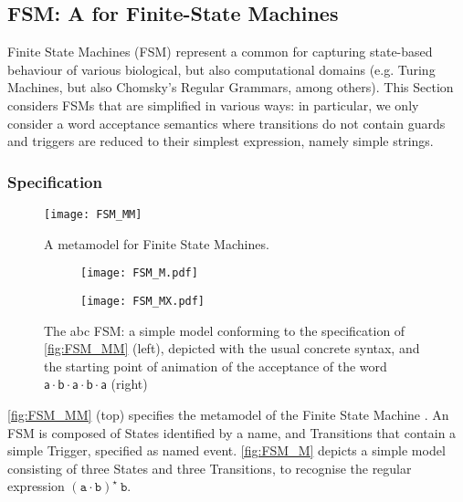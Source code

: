 \subsection{\textsf{FSM}: A \DSL for Finite-State Machines}
\label{sec:Examples:FSM}

Finite State Machines (FSM) represent a common \DSL for capturing state-based 
behaviour of various biological, but also computational domains (e.g. Turing 
Machines, but also Chomsky's Regular Grammars, among others). This Section considers
FSMs that are simplified in various ways: in particular, we only consider a
word acceptance semantics where transitions do not contain guards and triggers are
reduced to their simplest expression, namely simple strings.

\subsubsection{Specification}
\label{sec:Examples:FSM:Specification}

\begin{figure}[t]%
   \centering
   \texttt{[image: FSM\_MM]}%
   \caption{A metamodel for Finite State Machines.}%
   \label{fig:FSM_MM}%
\end{figure}

\begin{figure}[t]%
   \centering
   \begin{subfigure}[b]{0.45\columnwidth}
      \centering
      \texttt{[image: FSM\_M.pdf]}%
   \end{subfigure}
   \hfill
   \begin{subfigure}[b]{0.45\columnwidth}
      \centering
      \texttt{[image: FSM\_MX.pdf]}%
   \end{subfigure}
  \caption{The \textsf{abc} FSM: a simple model conforming to the specification
   of \autoref{fig:FSM_MM} (left), depicted with the usual concrete syntax, and 
   the starting point of animation of the acceptance of the word 
   $\mathsf{a\cdot b \cdot a \cdot b \cdot a}$ (right)}%
   \label{fig:FSM_M}%
\end{figure}



\autoref{fig:FSM_MM} (top) specifies the metamodel of the Finite State Machine \DSL. 
An \textsf{FSM} is composed of \textsf{State}s identified by a \textsf{name}, and
\textsf{Transition}s that contain a simple \textsf{Trigger}, specified as 
\textsf{name}d event. \autoref{fig:FSM_M} depicts a simple model consisting of 
three \textsf{State}s and three \textsf{Transition}s, to recognise the regular 
expression $\mathtt{(a\cdot b)^\star\ b}$. 

